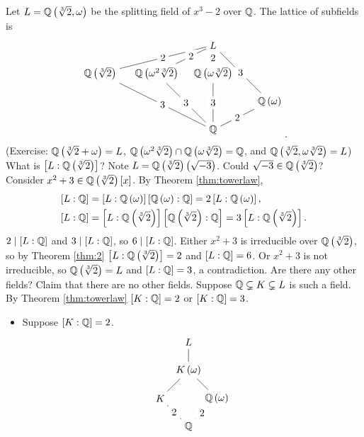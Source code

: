 \begin{example}
Let $ L = \mathbb{Q}\left( \sqrt[3]{2}, \omega \right) $ be the splitting field of $ x^3 - 2 $ over $ \mathbb{Q} $. The lattice of subfields is
$$
\begin{tikzpicture}
\node (L) at (0, 3) {$ L $};
\node (K1) at (-4, 2) {$ \Q\rb{\sqrt[3]{2}} $};
\node (K2) at (-2, 2) {$ \Q\rb{\omega^2\sqrt[3]{2}} $};
\node (K3) at (-0, 2) {$ \Q\rb{\omega\sqrt[3]{2}} $};
\node (K) at (2, 1) {$ \Q\rb{\omega} $};
\node (Q) at (0, 0) {$ \Q $};
\draw (L) -- node[fill=white]{2} (K1) -- node[fill=white]{3} (Q);
\draw (L) -- node[fill=white]{2} (K2) -- node[fill=white]{3} (Q);
\draw (L) -- node[fill=white]{2} (K3) -- node[fill=white]{3} (Q);
\draw (L) -- node[fill=white]{3} (K) -- node[fill=white]{2} (Q);
\end{tikzpicture}.
$$
(Exercise: $ \mathbb{Q}\left( \sqrt[3]{2} + \omega \right) = L $, $ \mathbb{Q}\left( \omega^2\sqrt[3]{2} \right) \cap \mathbb{Q}\left( \omega\sqrt[3]{2} \right) = \mathbb{Q} $, and $ \mathbb{Q}\left( \sqrt[3]{2}, \omega\sqrt[3]{2} \right) = L $) What is $ \left[ L : \mathbb{Q}\left( \sqrt[3]{2} \right) \right] $? Note $ L = \mathbb{Q}\left( \sqrt[3]{2} \right)\left( \sqrt{-3} \right) $. Could $ \sqrt{-3} \in \mathbb{Q}\left( \sqrt[3]{2} \right) $? Consider $ x^2 + 3 \in \mathbb{Q}\left( \sqrt[3]{2} \right)\left[ x \right] $. By Theorem \ref{thm:towerlaw},
\begin{align*}
\left[ L : \mathbb{Q} \right] & = \left[ L : \mathbb{Q}\left( \omega \right) \right]\left[ \mathbb{Q}\left( \omega \right) : \mathbb{Q} \right] = 2\left[ L : \mathbb{Q}\left( \omega \right) \right], \\
\left[ L : \mathbb{Q} \right] & = \left[ L : \mathbb{Q}\left( \sqrt[3]{2} \right) \right]\left[ \mathbb{Q}\left( \sqrt[3]{2} \right) : \mathbb{Q} \right] = 3\left[ L : \mathbb{Q}\left( \sqrt[3]{2} \right) \right].
\end{align*}
$ 2 \mid \left[ L : \mathbb{Q} \right] $ and $ 3 \mid \left[ L : \mathbb{Q} \right] $, so $ 6 \mid \left[ L : \mathbb{Q} \right] $. Either $ x^2 + 3 $ is irreducible over $ \mathbb{Q}\left( \sqrt[3]{2} \right) $, so by Theorem \ref{thm:2} $ \left[ L : \mathbb{Q}\left( \sqrt[3]{2} \right) \right] = 2 $ and $ \left[ L : \mathbb{Q} \right] = 6 $. Or $ x^2 + 3 $ is not irreducible, so $ \mathbb{Q}\left( \sqrt[3]{2} \right) = L $ and $ \left[ L : \mathbb{Q} \right] = 3 $, a contradiction. Are there any other fields? Claim that there are no other fields. Suppose $ \mathbb{Q} \subsetneq K \subsetneq L $ is such a field. By Theorem \ref{thm:towerlaw} $ \left[ K : \mathbb{Q} \right] = 2 $ or $ \left[ K : \mathbb{Q} \right] = 3 $.
\begin{itemize}
\item Suppose $ \left[ K : \mathbb{Q} \right] = 2 $.
$$
\begin{tikzpicture}
\node (L) at (0, 2) {$ L $};
\node (K') at (0, 1) {$ K\rb{\omega} $};
\node (K) at (-1, 0) {$ K $};
\node (Q') at (1, 0) {$ \Q\rb{\omega} $};
\node (Q) at (0, -1) {$ \Q $};
\draw (L) -- (K');
\draw (K') -- (K) -- node[fill=white]{2} (Q);
\draw (K') -- (Q') -- node[fill=white]{2} (Q);
\end{tikzpicture}
$$
\end{itemize}
\end{example}
